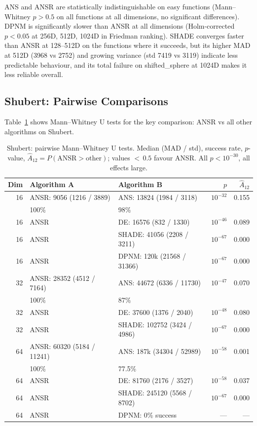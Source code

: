 \documentclass[11pt,a4paper]{article}
\begin{document}
ANS and ANSR are statistically indistinguishable on easy functions (Mann--Whitney $p > 0.5$ on all functions at all dimensions, no significant differences). DPNM is significantly slower than ANSR at all dimensions (Holm-corrected $p < 0.05$ at 256D, 512D, 1024D in Friedman ranking). SHADE converges faster than ANSR at 128--512D on the functions where it succeeds, but its higher MAD at 512D (3968 vs 2752) and growing variance (std 7419 vs 3119) indicate less predictable behaviour, and its total failure on shifted\_sphere at 1024D makes it less reliable overall.

\subsection{Shubert: Pairwise Comparisons}

Table~\ref{tab:shubert_stat} shows Mann--Whitney U tests for the key comparison: ANSR vs all other algorithms on Shubert.

\begin{table}[ht]
\centering
\caption{Shubert: pairwise Mann--Whitney U tests. Median (MAD / std), success rate, $p$-value, $\hat{A}_{12} = P(\text{ANSR} > \text{other})$; values ${<}\,0.5$ favour ANSR. All $p < 10^{-30}$, all effects large.}
\label{tab:shubert_stat}
\begin{tabular}{@{}rllrr@{}}
\toprule
Dim & Algorithm A & Algorithm B & $p$ & $\hat{A}_{12}$ \\
\midrule
16 & ANSR: 9056 (1216 / 3889) & ANS: 13824 (1984 / 3118) & $10^{-32}$ & 0.155 \\
   & 100\% & 98\% & & \\
16 & ANSR & DE: 16576 (832 / 1330) & $10^{-46}$ & 0.089 \\
16 & ANSR & SHADE: 41056 (2208 / 3211) & $10^{-67}$ & 0.000 \\
16 & ANSR & DPNM: 120k (21568 / 31366) & $10^{-67}$ & 0.000 \\
\midrule
32 & ANSR: 28352 (4512 / 7164) & ANS: 44672 (6336 / 11730) & $10^{-47}$ & 0.070 \\
   & 100\% & 87\% & & \\
32 & ANSR & DE: 37600 (1376 / 2040) & $10^{-48}$ & 0.080 \\
32 & ANSR & SHADE: 102752 (3424 / 4986) & $10^{-67}$ & 0.000 \\
\midrule
64 & ANSR: 60320 (5184 / 11241) & ANS: 187k (34304 / 52989) & $10^{-58}$ & 0.001 \\
   & 100\% & 77.5\% & & \\
64 & ANSR & DE: 81760 (2176 / 3527) & $10^{-58}$ & 0.037 \\
64 & ANSR & SHADE: 245120 (5568 / 8702) & $10^{-67}$ & 0.000 \\
64 & ANSR & DPNM: 0\% success & --- & --- \\
\bottomrule
\end{tabular}
\end{table}
\end{document}
